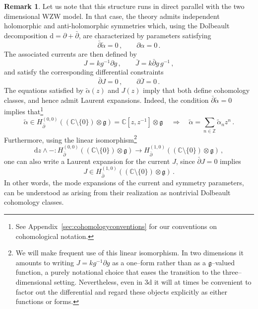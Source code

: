 \documentclass[11pt]{amsart}
\newcommand{\C}{{\mathbb C}}
\newcommand{\ta}{{\tilde \alpha}}
\newcommand{\dr}{{\mathrm{d}}}
\newcommand{\fg}{\mathfrak{g}}
\numberwithin{equation}{section}
\numberwithin{figure}{section}
\numberwithin{table}{section}
\theoremstyle{thm}
\numberwithin{equation}{subsection}
\theoremstyle{definition}
\theoremstyle{rem}
\newtheorem{remark}{Remark}
\begin{document}
\begin{remark}
    Let us note that this structure runs in direct parallel with the two dimensional WZW model. In that case, the theory admits independent holomorphic and anti-holomorphic symmetries which, using the Dolbeault decomposition $\dr = \partial + \bar\partial$, are characterized by parameters satisfying
\begin{equation}
    \bar\partial \tilde\alpha = 0 \,, \qquad \partial \alpha = 0\,.
\end{equation}
The associated currents are then defined by
\begin{equation}
    J = k g^{-1}\partial g \,, \qquad \bar J = k \bar\partial g\, g^{-1}\,,
\end{equation}
and satisfy the corresponding differential constraints
\begin{equation}
\label{ec:holocondition}
    \bar\partial J = 0 \,, \qquad \partial \bar J = 0\,.
\end{equation}
The equations satisfied by $\ta(z)$ and $J(z)$ imply that both define cohomology classes, and hence admit Laurent expansions. Indeed, the condition $\bar \partial \tilde \alpha = 0$ implies that\footnote{See Appendix~\ref{sec:cohomologyconventions} for our conventions on cohomological notation.}
\begin{equation}
    \tilde \alpha \in H^{(0,0)}_{\bar \partial}((\mathbb{C}\setminus\{0\})\otimes \fg) = \C[z,z^{-1}]\otimes \mathfrak{g}\, \quad \Longrightarrow \quad \tilde \alpha = \sum_{n\in \mathbb{Z}}\tilde \alpha_n z^n\,.
\end{equation}
Furthermore, using the linear isomorphism\footnote{We will make frequent use of this linear isomorphism. In two dimensions it 
amounts to writing $J = kg^{-1}\partial g$ as a one–form rather than as a 
$\fg$–valued function, a purely notational choice that eases the transition to 
the three–dimensional setting. Nevertheless, even in 3d it will at times be convenient 
to factor out the differential and regard these objects explicitly as 
either functions or forms.}
\begin{equation}
    \dr z \wedge -:H^{(0,0)}_{\bar \partial}((\mathbb{C}\setminus\{0\})\otimes \fg) \to H^{(1,0)}_{\bar \partial}((\mathbb{C}\setminus\{0\})\otimes \fg)\,,
\end{equation}
one can also write a Laurent expansion for the current $J$, since $\bar \partial J = 0$ implies 
\begin{equation}
    J \in H^{(1,0)}_{\bar \partial}((\mathbb{C}\setminus\{0\})\otimes \fg) \,.
\end{equation}
In other words, the mode expansions of the current and symmetry parameters, can be understood as arising from their realization as nontrivial Dolbeault cohomology classes.
\end{remark}
\end{document}
